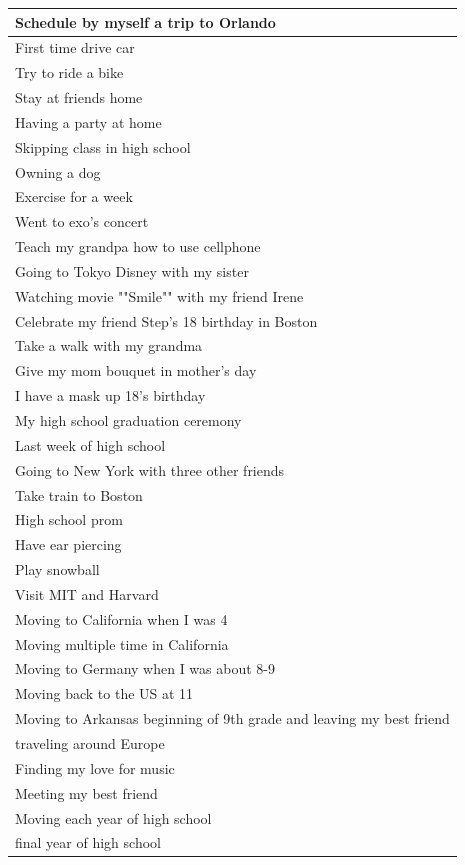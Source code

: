 \documentclass[
  .7em,
  letterpaper,
  DIV=11,
  numbers=noendperiod]{scrartcl}
\begin{document}
\begin{table}
\begin{tabular}{l}
Schedule by myself a trip to Orlando\\
\hline
First time drive car\\
\hline
Try to ride a bike\\
\hline
Stay at friends home\\
\hline
Having a party at home\\
\hline
Skipping class in high school\\
\hline
Owning a dog\\
\hline
Exercise for a week\\
\hline
Went to exo's concert\\
\hline
Teach my grandpa how to use cellphone\\
\hline
Going to Tokyo Disney with my sister\\
\hline
Watching movie ""Smile"" with my friend Irene\\
\hline
Celebrate my friend Step's 18 birthday in Boston\\
\hline
Take a walk with my grandma\\
\hline
Give my mom bouquet in mother's day\\
\hline
I have a mask up 18's birthday\\
\hline
My high school graduation ceremony\\
\hline
Last week of high school\\
\hline
Going to New York with three other friends\\
\hline
Take train to Boston\\
\hline
High school prom\\
\hline
Have ear piercing\\
\hline
Play snowball\\
\hline
Visit MIT and Harvard\\
\hline
Moving to California when I was 4\\
\hline
Moving multiple time in California\\
\hline
Moving to Germany when I was about 8-9\\
\hline
Moving back to the US at 11\\
\hline
Moving to Arkansas beginning of 9th grade and leaving my best friend\\
\hline
traveling around Europe\\
\hline
Finding my love for music\\
\hline
Meeting my best friend\\
\hline
Moving each year of high school\\
\hline
final year of high school\\

\end{tabular}
\end{table}
\end{document}
